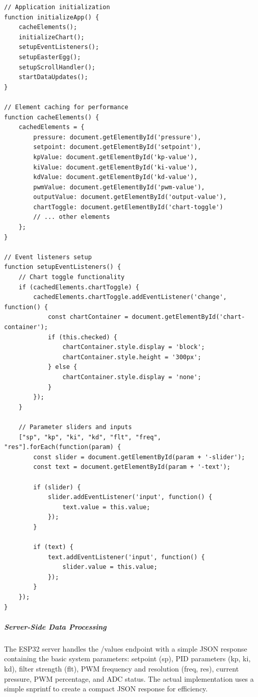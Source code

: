 \begin{lstlisting}[caption=Actual JavaScript Implementation from WebContent.h]
// Application initialization
function initializeApp() {
    cacheElements();
    initializeChart();
    setupEventListeners();
    setupEasterEgg();
    setupScrollHandler();
    startDataUpdates();
}

// Element caching for performance
function cacheElements() {
    cachedElements = {
        pressure: document.getElementById('pressure'),
        setpoint: document.getElementById('setpoint'),
        kpValue: document.getElementById('kp-value'),
        kiValue: document.getElementById('ki-value'),
        kdValue: document.getElementById('kd-value'),
        pwmValue: document.getElementById('pwm-value'),
        outputValue: document.getElementById('output-value'),
        chartToggle: document.getElementById('chart-toggle')
        // ... other elements
    };
}

// Event listeners setup
function setupEventListeners() {
    // Chart toggle functionality
    if (cachedElements.chartToggle) {
        cachedElements.chartToggle.addEventListener('change', function() {
            const chartContainer = document.getElementById('chart-container');
            if (this.checked) {
                chartContainer.style.display = 'block';
                chartContainer.style.height = '300px';
            } else {
                chartContainer.style.display = 'none';
            }
        });
    }
    
    // Parameter sliders and inputs
    ["sp", "kp", "ki", "kd", "flt", "freq", "res"].forEach(function(param) {
        const slider = document.getElementById(param + '-slider');
        const text = document.getElementById(param + '-text');
        
        if (slider) {
            slider.addEventListener('input', function() {
                text.value = this.value;
            });
        }
        
        if (text) {
            text.addEventListener('input', function() {
                slider.value = this.value;
            });
        }
    });
}
\end{lstlisting}


\subparagraph{Server-Side Data Processing}
The ESP32 server handles the /values endpoint with a simple JSON response containing the basic system parameters: setpoint (sp), PID parameters (kp, ki, kd), filter strength (flt), PWM frequency and resolution (freq, res), current pressure, PWM percentage, and ADC status. The actual implementation uses a simple snprintf to create a compact JSON response for efficiency.

